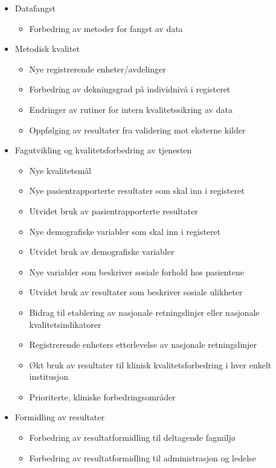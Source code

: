 \documentclass[norsk, a4paper, twocolumn]{report}
\begin{document}
\begin{itemize}
  \item Datafangst
    \begin{itemize}
      \item Forbedring av metoder for fangst av data
    \end{itemize}
  \item Metodisk kvalitet
    \begin{itemize}
      \item Nye registrerende enheter/avdelinger
      \item Forbedring av dekningsgrad på individnivå i registeret
      \item Endringer av rutiner for intern kvalitetssikring av data
      \item Oppfølging av resultater fra validering mot eksterne kilder
    \end{itemize}
  \item Fagutvikling og kvalitetsforbedring av tjenesten
    \begin{itemize}
      \item Nye kvalitetsmål
      \item Nye pasientrapporterte resultater som skal inn i registeret
      \item Utvidet bruk av pasientrapporterte resultater
      \item Nye demografiske variabler som skal inn i registeret
      \item Utvidet bruk av demografiske variabler
      \item Nye variabler som beskriver sosiale forhold hos pasientene
      \item Utvidet bruk av resultater som beskriver sosiale ulikheter
      \item Bidrag til etablering av nasjonale retningslinjer eller 
        nasjonale kvalitetsindikatorer
      \item Registrerende enheters etterlevelse av nasjonale retningslinjer
      \item Økt bruk av resultater til klinisk kvalitetsforbedring i hver enkelt
        institusjon
      \item Prioriterte, kliniske forbedringsområder
    \end{itemize}
  \item Formidling av resultater
    \begin{itemize}
      \item Forbedring av resultatformidling til deltagende fagmiljø
      \item Forbedring av resultatformidling til administrasjon og ledelse

\end{itemize}
\end{itemize}
\end{document}
